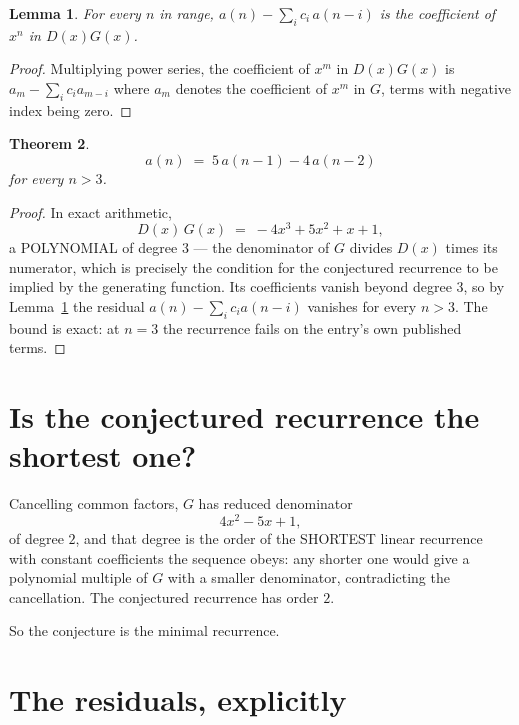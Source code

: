 \documentclass[11pt,a4paper]{article}
\theoremstyle{plain}
\newtheorem{theorem}{Theorem}
\newtheorem{lemma}[theorem]{Lemma}
\theoremstyle{definition}
\begin{document}
\begin{lemma}\label{lem:key}
For every $n$ in range, $a(n)-\sum_i c_i\,a(n-i)$ is the coefficient of $x^{n}$ in
$D(x)G(x)$.
\end{lemma}

\begin{proof}
Multiplying power series, the coefficient of $x^{m}$ in $D(x)G(x)$ is
$a_m-\sum_i c_i a_{m-i}$ where $a_m$ denotes the coefficient of $x^{m}$ in $G$, terms with
negative index being zero.
\end{proof}

\begin{theorem}
\[
a(n)\;=\;5\,a(n-1) - 4\,a(n-2)
\]
for every $n>3$.
\end{theorem}

\begin{proof}
In exact arithmetic,
\[
D(x)\,G(x)\;=\;- 4 x^{3} + 5 x^{2} + x + 1,
\]
a POLYNOMIAL of degree $3$ --- the denominator of $G$ divides $D(x)$ times its numerator,
which is precisely the condition for the conjectured recurrence to be implied by the
generating function. Its coefficients vanish beyond degree $3$, so by
Lemma~\ref{lem:key} the residual $a(n)-\sum_ic_ia(n-i)$ vanishes for every
$n>3$. The bound is exact: at $n=3$ the recurrence fails on the entry's own published terms.
\end{proof}

\section{Is the conjectured recurrence the shortest one?}

Cancelling common factors, $G$ has reduced denominator
\[
4 x^{2} - 5 x + 1,
\]
of degree $2$, and that degree is the order of the SHORTEST linear recurrence with
constant coefficients the sequence obeys: any shorter one would give a polynomial multiple of
$G$ with a smaller denominator, contradicting the cancellation. The conjectured recurrence has
order $2$.

So the conjecture is the minimal recurrence.

\section{The residuals, explicitly}
\end{document}
